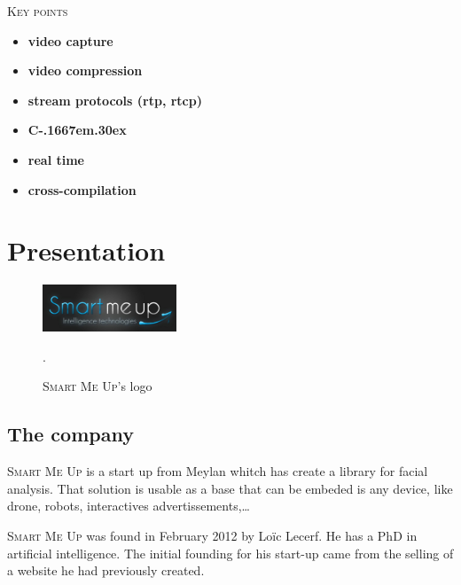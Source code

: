 \documentclass[a4paper,11pt]{custom}
\newcommand{\smu}{\textsc{Smart Me Up}}
\newcommand{\cpp}{%
  C\kern-.1667em\raise.30ex\hbox{\smaller{++}}%
  \spacefactor1000%
}
\begin{document}
\begin{center}
\textsc{\textsc{Key points}}
\end{center}

\begin{multicols}{2}
\begin{itemize}
\item \textbf{video capture}
\item \textbf{video compression}
\item \textbf{stream protocols (rtp, rtcp)}
\item \textbf{\cpp}
\item \textbf{real time}
\item \textbf{cross-compilation}
\end{itemize}
\end{multicols}

\newpage

%
\headerleftcontent{\headerlefttext}%
\headerrightcontent{\headerrighttext}%

\tableofcontents

\clearpage

\chapter{Presentation}

\begin{figure}[h!]
  \centering
  \includegraphics[width=4cm]{smartmeup.jpg}
  \label{fig:smartmeup}
  \caption{\smu's logo}.
\end{figure}

\section{The company}

\smu{} is a start up from Meylan whitch has create a library for facial
analysis. That solution is usable as a base that can be embeded is any device,
like drone, robots, interactives advertissements,…

\smu{} was found in February 2012 by Loïc Lecerf. He has a PhD in artificial
intelligence. The initial founding for his start-up came from the selling of
a website he had previously created.
\end{document}
